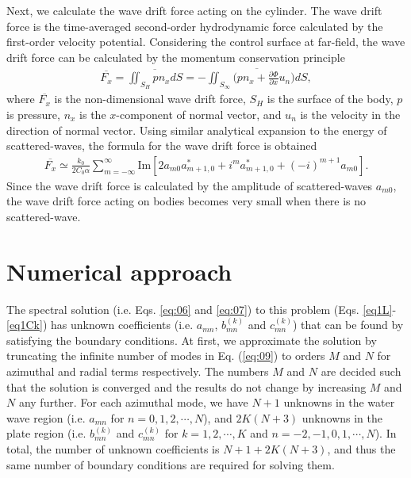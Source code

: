\documentclass{jfm}
\begin{document}
Next, we calculate the wave drift force acting on the cylinder. The wave drift force is the time-averaged second-order hydrodynamic force calculated by the first-order velocity potential.
Considering the control surface at far-field, the wave drift force can be calculated by the momentum conservation principle \cite[]{Maruo1960}  
\begin{eqnarray}
\displaystyle \overline{F_x}=\overline{\iint_{S_H}pn_xdS}=-\overline{\iint_{S_\infty}\bigg(pn_x+\frac{\partial \Phi}{\partial x}u_n\bigg)dS},
\label{eq:19}
\end{eqnarray}
where $\overline{F_x}$ is the non-dimensional wave drift force, $S_H$ is the surface of the body, $p$ is pressure, $n_x$ is the $x$-component of normal vector, and $u_n$ is the velocity in the direction of normal vector.
Using similar analytical expansion to the energy of scattered-waves, the formula for the wave drift force is obtained \cite[]{Kashiwagi2001} 
\begin{eqnarray}
\displaystyle \overline{F_x}\simeq \frac{k_0}{2C_0\alpha}\sum_{m=-\infty}^{\infty}\text{Im}[2a_{m0}a^*_{m+1,0}+i^ma^*_{m+1,0}+(-i)^{m+1}a_{m0}].
\label{eq:20}
\end{eqnarray}
Since the wave drift force is calculated by the amplitude of scattered-waves $a_{m0}$, the wave drift force acting on bodies becomes very small when there is no scattered-wave.



\section{Numerical approach}
\label{section:numerical-approach}
The spectral solution (i.e. Eqs. \eqref{eq:06} and \eqref{eq:07}) to this problem (Eqs. \eqref{eq1L}-\eqref{eq1Ck}) has unknown coefficients (i.e. $a_{mn}$, $b_{mn}^{(k)}$ and $c_{mn}^{(k)}$) that can be found by satisfying the boundary conditions.
At first, we approximate the solution by truncating the infinite number of modes in Eq. (\ref{eq:09}) to orders $M$ and $N$ for azimuthal and radial terms respectively. 
The numbers $M$ and $N$ are decided such that the solution is converged and the results do not change by increasing $M$ and $N$ any further. For each azimuthal mode, we have $N+1$ unknowns in the water wave region (i.e. $a_{mn}$ for $n=0,1,2,\cdots,N$), and $2K(N+3)$ unknowns in the plate region (i.e. $b^{(k)}_{mn}$ and $c^{(k)}_{mn}$ for $k=1,2,\cdots,K$ and $n=-2,-1,0,1,\cdots,N$).
In total, the number of unknown coefficients is $N+1+2K(N+3)$, and thus the same number of boundary conditions are required for solving them.
\end{document}

